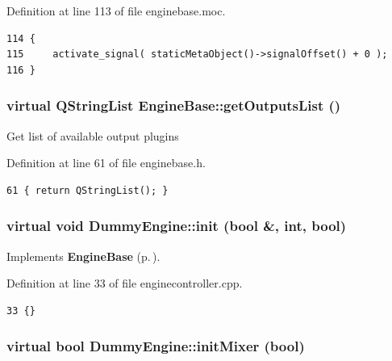 Definition at line 113 of file enginebase.moc.



\footnotesize\begin{verbatim}114 {
115     activate_signal( staticMetaObject()->signalOffset() + 0 );
116 }
\end{verbatim}\normalsize 
{}
\subsubsection{\setlength{\rightskip}{0pt plus 5cm}virtual QString\-List Engine\-Base::get\-Outputs\-List ()\hspace{0.3cm}{\tt  [inline, virtual, inherited]}}\label{classEngineBase_EngineBasea6}


Get list of available output plugins 

Definition at line 61 of file enginebase.h.



\footnotesize\begin{verbatim}61 { return QStringList(); }
\end{verbatim}\normalsize 
{}
\subsubsection{\setlength{\rightskip}{0pt plus 5cm}virtual void Dummy\-Engine::init (bool \&, int, bool)\hspace{0.3cm}{\tt  [inline, private, virtual]}}\label{classDummyEngine_DummyEngined0}




Implements {\bf Engine\-Base} {\rm (p.\,\pageref{classEngineBase_EngineBasea2})}.

Definition at line 33 of file enginecontroller.cpp.



\footnotesize\begin{verbatim}33 {}
\end{verbatim}\normalsize 
{}
\subsubsection{\setlength{\rightskip}{0pt plus 5cm}virtual bool Dummy\-Engine::init\-Mixer (bool)\hspace{0.3cm}{\tt  [inline, private, virtual]}}\label{classDummyEngine_DummyEngined1}


